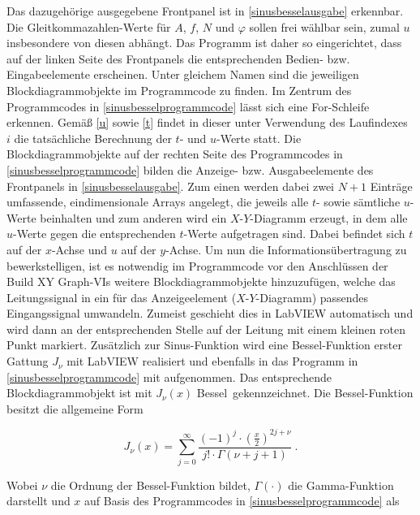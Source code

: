\documentclass[
a4paper,
12pt,
pagesize,
ngerman
]{scrartcl}
\begin{document}
	\noindent Das dazugehörige ausgegebene Frontpanel ist in \cref{sinusbesselausgabe} erkennbar. Die Gleitkommazahlen-Werte für $A$, $f$, $N$ und $\varphi$ sollen frei wählbar sein, zumal $u$ insbesondere von diesen abhängt. Das Programm ist daher so eingerichtet, dass auf der linken Seite des Frontpanels die entsprechenden Bedien- bzw. Eingabeelemente erscheinen. Unter gleichem Namen sind die jeweiligen Blockdiagrammobjekte im Programmcode zu finden. Im Zentrum des Programmcodes in \cref{sinusbesselprogrammcode} lässt sich eine For-Schleife erkennen. Gemäß \cref{u} sowie \cref{t} findet in dieser unter Verwendung des Laufindexes $i$ die tatsächliche Berechnung der $t$- und $u$-Werte statt. Die Blockdiagrammobjekte auf der rechten Seite des Programmcodes in \cref{sinusbesselprogrammcode} bilden die Anzeige- bzw. Ausgabeelemente des Frontpanels in \cref{sinusbesselausgabe}. Zum einen werden dabei zwei $N+1$ Einträge umfassende, eindimensionale Arrays angelegt, die jeweils alle $t$- sowie sämtliche $u$-Werte beinhalten und zum anderen wird ein $X$-$Y$-Diagramm erzeugt, in dem alle $u$-Werte gegen die entsprechenden $t$-Werte aufgetragen sind.
	Dabei befindet sich $t$ auf der $x$-Achse und $u$ auf der $y$-Achse. 
	Um nun die Informationsübertragung zu bewerkstelligen, ist es notwendig im Programmcode vor den Anschlüssen der \glqq Build XY Graph\grqq -VIs weitere Blockdiagrammobjekte hinzuzufügen, welche das Leitungssignal in ein für das Anzeigeelement ($X$-$Y$-Diagramm) passendes Eingangssignal umwandeln. Zumeist geschieht dies in LabVIEW automatisch und wird dann an der entsprechenden Stelle auf der Leitung mit einem kleinen roten Punkt markiert.
	Zusätzlich zur Sinus-Funktion wird eine Bessel-Funktion erster Gattung $J_{\nu}$ mit LabVIEW realisiert und ebenfalls in das Programm in \cref{sinusbesselprogrammcode} mit aufgenommen. Das entsprechende Blockdiagrammobjekt ist mit \glqq $J_{\nu}(x)$ Bessel\grqq\ gekennzeichnet. Die Bessel-Funktion besitzt die allgemeine Form
	
	\begin{equation}
	J_{\nu}(x) = \sum_{j=0}^{\infty}\frac{(-1)^j \cdot \left( \frac{x}{2}\right) ^{2j+\nu}}{j! \cdot \Gamma(\nu + j + 1)} \ . %
	\end{equation}
	
	\noindent Wobei $\nu$ die Ordnung der Bessel-Funktion bildet, $\Gamma(\cdot)$ die Gamma-Funktion darstellt und $x$ auf Basis des Programmcodes in \cref{sinusbesselprogrammcode} als %
	
\end{document}

